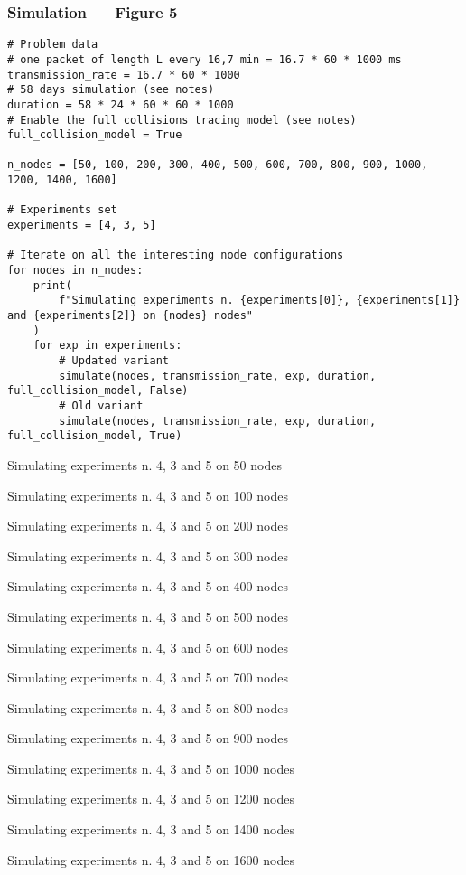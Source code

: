 \documentclass[a4paper,11pt]{article} %
\begin{document}
    \subsubsection*{Simulation — Figure 5}

    \begin{verbatim}
# Problem data
# one packet of length L every 16,7 min = 16.7 * 60 * 1000 ms
transmission_rate = 16.7 * 60 * 1000
# 58 days simulation (see notes)
duration = 58 * 24 * 60 * 60 * 1000
# Enable the full collisions tracing model (see notes)
full_collision_model = True

n_nodes = [50, 100, 200, 300, 400, 500, 600, 700, 800, 900, 1000, 1200, 1400, 1600]

# Experiments set
experiments = [4, 3, 5]

# Iterate on all the interesting node configurations
for nodes in n_nodes:
    print(
        f"Simulating experiments n. {experiments[0]}, {experiments[1]} and {experiments[2]} on {nodes} nodes"
    )
    for exp in experiments:
        # Updated variant
        simulate(nodes, transmission_rate, exp, duration, full_collision_model, False)
        # Old variant
        simulate(nodes, transmission_rate, exp, duration, full_collision_model, True)
    \end{verbatim}

    \label{output-fig5}
    \begin{tcolorbox}
        Simulating experiments n. 4, 3 and 5 on 50 nodes

        Simulating experiments n. 4, 3 and 5 on 100 nodes

        Simulating experiments n. 4, 3 and 5 on 200 nodes

        Simulating experiments n. 4, 3 and 5 on 300 nodes

        Simulating experiments n. 4, 3 and 5 on 400 nodes

        Simulating experiments n. 4, 3 and 5 on 500 nodes

        Simulating experiments n. 4, 3 and 5 on 600 nodes

        Simulating experiments n. 4, 3 and 5 on 700 nodes

        Simulating experiments n. 4, 3 and 5 on 800 nodes

        Simulating experiments n. 4, 3 and 5 on 900 nodes

        Simulating experiments n. 4, 3 and 5 on 1000 nodes

        Simulating experiments n. 4, 3 and 5 on 1200 nodes

        Simulating experiments n. 4, 3 and 5 on 1400 nodes

        Simulating experiments n. 4, 3 and 5 on 1600 nodes
    \end{tcolorbox}
\end{document}
